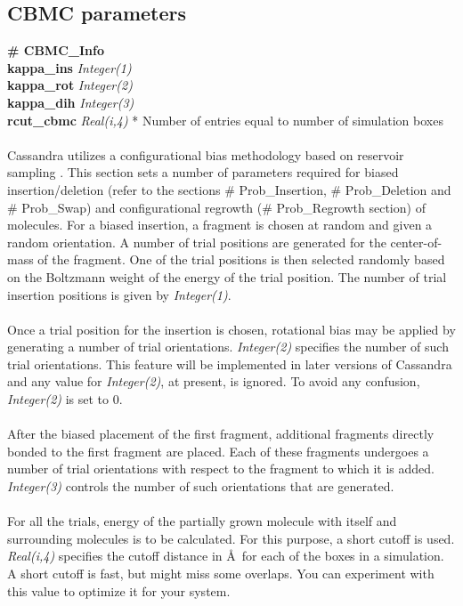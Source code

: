\subsection{CBMC parameters}\label{sec:CBMC_Info}
{\bf \# CBMC\_Info} \\
{\bf kappa\_ins} {\it Integer(1)} \\
{\bf kappa\_rot} {\it Integer(2)} \\
{\bf kappa\_dih} {\it Integer(3)} \\
{\bf rcut\_cbmc} {\it Real(i,4)} * Number of entries equal to number of simulation boxes\\ \\
%
Cassandra utilizes a configurational bias methodology based on reservoir sampling \cite{Shah:2011}.
This section sets a number of parameters required for biased insertion/deletion (refer to the sections
\# Prob\_Insertion, \# Prob\_Deletion and \# Prob\_Swap) and configurational
regrowth (\# Prob\_Regrowth section) of molecules. For a biased insertion, a fragment is chosen at random and given
a random orientation. A number of trial positions are generated for the center-of-mass of the fragment.
One of the trial positions is then selected randomly based on the Boltzmann weight of the energy of
the trial position. The number of trial insertion positions is given by {\it Integer(1)}. \\ \\
%
Once a trial position for the insertion is chosen, rotational bias may be applied by generating a number
of trial orientations. {\it Integer(2)} specifies the number of such trial orientations. This feature will be
implemented in later versions of Cassandra and any value for {\it Integer(2)}, at present, is ignored.
To avoid any confusion, {\it Integer(2)} is set to 0. \\ \\
%
After the biased placement of the first fragment, additional fragments directly bonded to the first fragment
are placed. Each of these fragments undergoes a number of trial orientations with  respect
to the fragment to which it is added. {\it Integer(3)} controls the number of such orientations that are
generated. \\ \\
%
For all the trials, energy of the partially grown molecule with itself and surrounding molecules is to be calculated. For this purpose, a short
cutoff is used. {\it Real(i,4)} specifies the cutoff distance in \AA\ for each of the boxes in a simulation. A short cutoff is fast, but might miss some overlaps. You can experiment with this value to optimize it for your system.\\ \\
